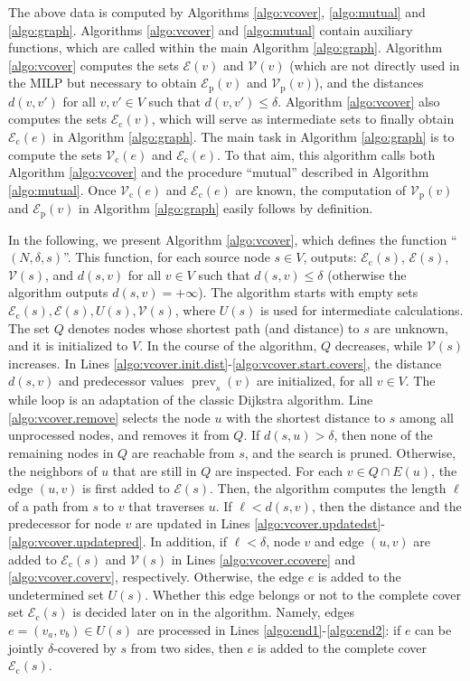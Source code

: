 \documentclass[review]{elsarticle}
\newcommand{\cE}{{\mathcal E}}
\newcommand{\cV}{{\mathcal V}}
\newcommand{\dlt}{{\delta}}
\newcommand{\ncalgo}{\text{nodeCover}}
\DeclareMathOperator{\prev}{prev}
\theoremstyle{definition}
\begin{document}
The above data is computed by Algorithms \ref{algo:vcover}, \ref{algo:mutual}  and \ref{algo:graph}. Algorithms \ref{algo:vcover} and \ref{algo:mutual} contain auxiliary functions, which are called within the main Algorithm \ref{algo:graph}. Algorithm \ref{algo:vcover} computes the sets  $\cE(v)$ and $\cV(v)$ (which are not directly used in the MILP but necessary to obtain $\cE_{\mathrm{p}}(v)$ and $\cV_{\mathrm{p}}(v)$), and the distances $d(v,v')$ for all $v,v'\in V$ such that $d(v,v')\leq \dlt$. Algorithm \ref{algo:vcover} also computes the sets $\cE_{\mathrm{c}}(v)$,
which will serve as intermediate sets to finally obtain $\cE_{\mathrm{c}}(e)$ in Algorithm \ref{algo:graph}.  The main task in Algorithm \ref{algo:graph} is to compute the sets  $\cV_{\mathrm{c}}(e)$ and $\cE_{\mathrm{c}}(e)$. To that aim, this algorithm calls both Algorithm \ref{algo:vcover} and the procedure ``mutual'' described in Algorithm \ref{algo:mutual}. Once  $\cV_{\mathrm{c}}(e)$ and $\cE_{\mathrm{c}}(e)$ are known, the computation of $\cV_{\mathrm{p}}(v)$ and $\cE_{\mathrm{p}}(v)$ in Algorithm \ref{algo:graph} easily follows by definition.

In the following, we present Algorithm \ref{algo:vcover}, which defines the function ``\ncalgo{}$(N,\dlt,s)$''. This function, for each source node $s \in V$, outputs: $\cE_{\mathrm{c}}(s)$, $\cE(s)$,  $\cV(s)$,
and $d(s,v)$ for all $v\in V$ such that $d(s,v)\leq \dlt$ (otherwise the algorithm outputs $d(s,v)=+\infty$). The algorithm  starts with empty sets $\cE_{\mathrm{c}}(s), \cE(s), U(s), \cV(s)$, where $U(s)$ is used for intermediate calculations. The set $Q$ denotes nodes whose shortest path (and distance) to $s$ are unknown, and it is initialized to $V$. In the course of the algorithm, $Q$ decreases, while $\cV(s)$ increases. In Lines \ref{algo:vcover.init.dist}-\ref{algo:vcover.start.covers}, the distance $d(s,v)$ and predecessor values $\prev_s(v)$ are initialized, for all $v\in V$. The while loop is an adaptation of the classic Dijkstra algorithm. Line \ref{algo:vcover.remove} selects the node $u$ with the shortest distance to $s$ among all unprocessed nodes, and removes it from $Q$.  If $d(s,u) > \dlt$, then none of the remaining nodes in $Q$ are reachable from $s$, and the search is pruned. Otherwise, the neighbors of $u$ that are still in $Q$ are inspected. For each $v\in Q\cap E(u)$, the edge $(u,v)$ is first added to $\cE(s)$. Then, the algorithm computes the length $\ell$ of a path from $s$ to $v$ that traverses $u$. If $\ell < d(s,v)$, then the distance and the predecessor for node $v$ are updated in Lines \ref{algo:vcover.updatedst}- \ref{algo:vcover.updatepred}. In addition, if $\ell < \dlt$,  node $v$ and edge $(u,v)$ are added to $\cE_{\mathrm{c}}(s)$ and $\cV(s)$ in Lines \ref{algo:vcover.ccovere} and \ref{algo:vcover.coverv}, respectively.  Otherwise, the edge $e$ is added to the undetermined set $U(s)$. Whether this edge belongs or not to the complete cover set $\cE_{\mathrm{c}}(s)$ is decided later on in the algorithm. Namely,  edges $e=(v_a, v_b)\in U(s)$ are processed in Lines \ref{algo:end1}-\ref{algo:end2}:  if $e$ can be jointly $\dlt$-covered  by $s$ from two sides, then $e$ is added to the complete cover $\cE_{\mathrm{c}}(s)$.
\end{document}
